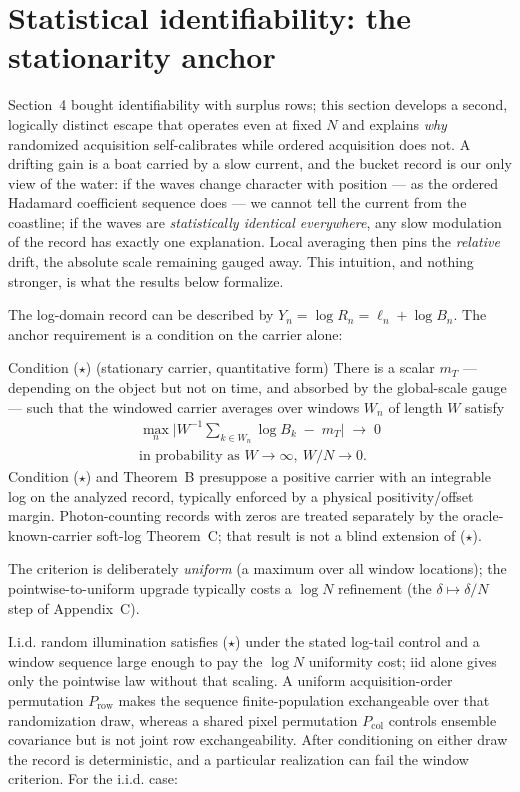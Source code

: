 \section{Statistical identifiability: the stationarity anchor}

Section~4 bought identifiability with surplus rows; this section develops a second, logically distinct escape that operates even at fixed $N$ and explains \emph{why} randomized acquisition self-calibrates while ordered acquisition does not. A drifting gain is a boat carried by a slow current, and the bucket record is our only view of the water: if the waves change character with position --- as the ordered Hadamard coefficient sequence does --- we cannot tell the current from the coastline; if the waves are \emph{statistically identical everywhere}, any slow modulation of the record has exactly one explanation. Local averaging then pins the \emph{relative} drift, the absolute scale remaining gauged away. This intuition, and nothing stronger, is what the results below formalize.

The log-domain record can be described by $Y_n=\log R_n=\ell_n+\log B_n$. The anchor requirement is a condition on the carrier alone:

\begin{nameddef}{Condition ($\star$) (stationary carrier, quantitative form)}
There is a scalar $m_T$ --- depending on the object but not on time, and absorbed by the global-scale gauge --- such that the windowed carrier averages over windows $W_n$ of length $W$ satisfy
\[
\begin{gathered}
\max_n \Big| W^{-1}\!\!\sum_{k\in W_n}\!\log B_k \;-\; m_T \Big| \;\longrightarrow\; 0\\
\text{in probability as } W\to\infty,\ W/N\to 0 .
\end{gathered}
\]
Condition ($\star$) and Theorem~B presuppose a positive carrier with an integrable log on the analyzed record, typically enforced by a physical positivity/offset margin. Photon-counting records with zeros are treated separately by the oracle-known-carrier soft-log Theorem~C; that result is not a blind extension of ($\star$).
\end{nameddef}

The criterion is deliberately \emph{uniform} (a maximum over all window locations); the pointwise-to-uniform upgrade typically costs a $\log N$ refinement (the $\delta\mapsto\delta/N$ step of Appendix~C).

I.i.d. random illumination satisfies ($\star$) under the stated log-tail control and a window sequence large enough to pay the $\log N$ uniformity cost; iid alone gives only the pointwise law without that scaling. A uniform acquisition-order permutation $P_{\mathrm{row}}$ makes the sequence finite-population exchangeable over that randomization draw, whereas a shared pixel permutation $P_{\mathrm{col}}$ controls ensemble covariance but is not joint row exchangeability. After conditioning on either draw the record is deterministic, and a particular realization can fail the window criterion. For the i.i.d. case:


